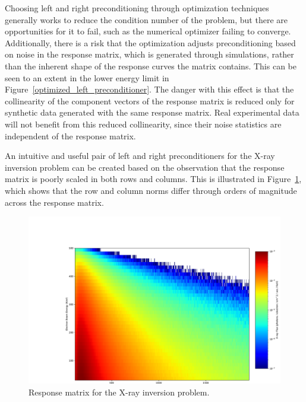 Choosing left and right preconditioning through optimization techniques generally works to reduce the condition number of the problem, but there are opportunities for it to fail, such as the numerical optimizer failing to converge. Additionally, there is a risk that the optimization adjusts preconditioning based on noise in the response matrix, which is generated through simulations, rather than the inherent shape of the response curves the matrix contains. This can be seen to an extent in the lower energy limit in Figure~\ref{optimized_left_preconditioner}. The danger with this effect is that the collinearity of the component vectors of the response matrix is reduced only for synthetic data generated with the same response matrix. Real experimental data will not benefit from this reduced collinearity, since their noise statistics are independent of the response matrix. 

An intuitive and useful pair of left and right preconditioners for the X-ray inversion problem can be created based on the observation that the response matrix is poorly scaled in both rows and columns. This is illustrated in Figure~\ref{matrix_scaling_plot}, which shows that the row and column norms differ through orders of magnitude across the response matrix.

\begin{figure}[p]
    \centering
    \hspace*{-2.5cm}
    \includegraphics[width=1.1\textwidth]{figures/chapter_4/matrix_scaling_plot/fig.pdf}
    \caption{Response matrix for the X-ray inversion problem.  }
    \label{matrix_scaling_plot}
\end{figure}